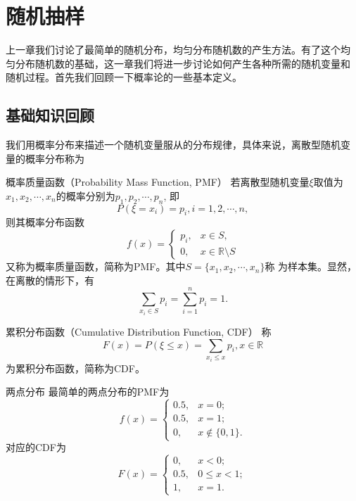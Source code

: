 \chapter{随机抽样}

上一章我们讨论了最简单的随机分布，均匀分布随机数的产生方法。有了这个均
匀分布随机数的基础，这一章我们将进一步讨论如何产生各种所需的随机变量和
随机过程。首先我们回顾一下概率论的一些基本定义。

\section{基础知识回顾}
我们用概率分布来描述一个随机变量服从的分布规律，具体来说，离散型随机变
量的概率分布称为

\begin{definition} {\hei 概率质量函数（Probability Mass Function, PMF）}
  若离散型随机变量$\xi$取值为$x_1, x_2, \cdots, x_n$的概率分别为$p_1,
  p_2, \cdots, p_n$, 即
  \begin{equation}
    P(\xi = x_i) = p_i, i = 1, 2, \cdots, n,
    \label{eq::dis_df}
  \end{equation}
  则其概率分布函数
  \begin{equation}
    f(x) = \left\{
    \begin{array}{ll}
      p_i, & x \in S,\\
      0, & x \in \mathbb{R}\setminus S
    \end{array}\right.
    \label{eq::dis_pmf}
  \end{equation}
  又称为概率质量函数，简称为PMF。其中$S = \{x_1, x_2, \cdots, x_n\}$称
  为样本集。显然，在离散的情形下，有
$$
\sum_{x_i \in S}p_i = \sum_{i = 1}^np_i = 1.
$$
\label{def::dis_pmf}
\end{definition}


\begin{definition} {\hei 累积分布函数（Cumulative Distribution Function, CDF）}
  称
  \begin{equation}
    F(x) = P(\xi \leq x) = \sum_{x_i \leq x}p_i, x \in \mathbb{R}
    \label{eq::dis_cdf}
  \end{equation}
  为累积分布函数，简称为CDF。
  \label{def::dis_cdf}
\end{definition}

\begin{example} {\hei 两点分布} 最简单的两点分布的PMF为
  \begin{equation}
    f(x) = \left\{\begin{array}{ll}
    0.5, &x = 0; \\
    0.5, &x = 1;\\
    0, &x \notin \{0, 1\}.
    \end{array}\right.
    \label{eq::2p_PMF}
  \end{equation}
  对应的CDF为
  \begin{equation}
    F(x) = \left\{\begin{array}{ll}
    0, & x < 0; \\
    0.5, &0 \leq x < 1; \\
    1, &x = 1.
    \end{array}\right.
    \label{eq::2p_CDF}
  \end{equation}
  \label{example::2p}
\end{example}

